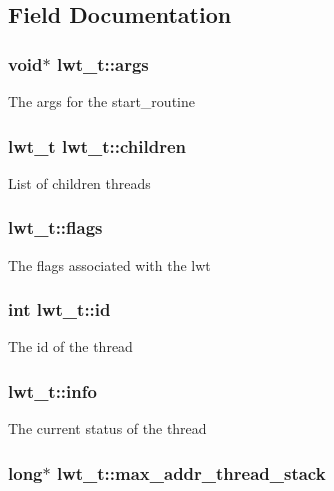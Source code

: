 \subsection{Field Documentation}
\hypertarget{structlwt_a6e870b21b996bc5c62b6cbd04328e784}{
\subsubsection[{args}]{\setlength{\rightskip}{0pt plus 5cm}void$\ast$ lwt\+\_\+t\+::args}}\label{structlwt_a6e870b21b996bc5c62b6cbd04328e784}
The args for the start\+\_\+routine \hypertarget{structlwt_a33d2fa8a95fe7c0deb7c7723bd4af344}{
\subsubsection[{children}]{\setlength{\rightskip}{0pt plus 5cm}lwt\+\_\+t lwt\+\_\+t\+::children}}\label{structlwt_a33d2fa8a95fe7c0deb7c7723bd4af344}
List of children threads \hypertarget{structlwt_a21694dc7499aff78ea8f90140b0ec60c}{
\subsubsection[{flags}]{ lwt\+\_\+t\+::flags}}\label{structlwt_a21694dc7499aff78ea8f90140b0ec60c}
The flags associated with the lwt \hypertarget{structlwt_aa3df3d76d606756e38bb9bd3d2c2d241}{
\subsubsection[{id}]{\setlength{\rightskip}{0pt plus 5cm}int lwt\+\_\+t\+::id}}\label{structlwt_aa3df3d76d606756e38bb9bd3d2c2d241}
The id of the thread \hypertarget{structlwt_a40641e751624b983f5e1ae5302210e5d}{
\subsubsection[{info}]{ lwt\+\_\+t\+::info}}\label{structlwt_a40641e751624b983f5e1ae5302210e5d}
The current status of the thread \hypertarget{structlwt_ae97cdce617ee026378588f57a999f972}{
\subsubsection[{max\+\_\+addr\+\_\+thread\+\_\+stack}]{\setlength{\rightskip}{0pt plus 5cm}long$\ast$ lwt\+\_\+t\+::max\+\_\+addr\+\_\+thread\+\_\+stack}}\label{structlwt_ae97cdce617ee026378588f57a999f972}

